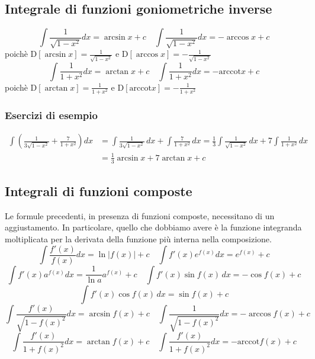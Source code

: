 \documentclass[11pt]{article}
\begin{document}
\subsection{Integrale di funzioni goniometriche inverse}
\[\boxed{\int \frac{1}{\sqrt{1-x^2}}dx=\arcsin x + c}\,\,\,\,\,\,\boxed{\int \frac{1}{\sqrt{1-x^2}}dx=-\arccos x + c}\]
poichè $\text{D}\left[\arcsin x \right]=\frac{1}{\sqrt{1-x^2}}$ e $\text{D}\left[\arccos x \right]=-\frac{1}{\sqrt{1-x^2}}$
\[\boxed{\int \frac{1}{1+x^2}dx=\arctan x + c}\,\,\,\,\,\,\boxed{\int \frac{1}{1+x^2}dx=-\text{arccot} x + c}\]
poichè $\text{D}\left[\arctan x \right]=\frac{1}{1+x^2}$ e $\text{D}\left[\text{arccot} x \right]=-\frac{1}{1+x^2}$

\subsubsection*{Esercizi di esempio}

\begin{align*} \int \left(\frac{1}{3\sqrt{1-x^2}}+\frac{7}{1+x^2}\right)dx &= \int \frac{1}{3\sqrt{1-x^2}}\,dx+\int \frac{7}{1+x^2}\,dx =  \frac{1}{3} \int \frac{1}{\sqrt{1-x^2}}\,dx+7\int \frac{1}{1+x^2}\,dx\\&=\boxed{\frac{1}{3}\arcsin x + 7 \arctan x + c} \end{align*}

\subsection{Integrali di funzioni composte}
Le formule precedenti, in presenza di funzioni composte, necessitano di un aggiustamento. In particolare, quello che dobbiamo avere è la funzione integranda moltiplicata per la derivata della funzione più interna nella composizione.
\[\boxed{\int\frac{f'(x)}{f(x)}dx=\ln \left|f(x)\right|+c}\,\,\,\,\,\,\boxed{\int f'(x) e^{f(x)}dx=e^{f(x)}+c}\]
\[\boxed{\int f'(x)a^{f(x)}dx=\frac{1}{\ln a} a^{f(x)}+c}\,\,\,\,\,\,\boxed{\int f'(x)\sin f(x) \,dx = - \cos f(x) + c}\]
\[\boxed{\int f'(x)\cos f(x) \,dx =  \sin f(x) + c}\]
\[\boxed{\int \frac{f'(x)}{\sqrt{1-{f(x)}^2}}dx=\arcsin f(x) + c}\,\,\,\,\,\,\boxed{\int \frac{1}{\sqrt{1-{f(x)}^2}}dx=-\arccos f(x)+ c}\]
\[\boxed{\int \frac{f'(x)}{1+{f(x)}^2}dx=\arctan f(x) + c}\,\,\,\,\,\,\boxed{\int \frac{f'(x)}{1+{f(x)}^2}dx=-\text{arccot} f(x) + c}\]
\end{document}
